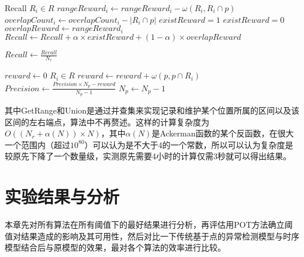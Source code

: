 \begin{breakablealgorithm}
\begin{algorithmic}[1]
      \State

      \State Recall 
      \ForAll $R_i \in R$
            \State $rangeReward_i \gets rangeReward_i - \omega(R_i,R_i \cap p)$
            \State $overlapCount_i \gets overlapCount_i - |R_i\cap p|$
              \State $existReward = 1$
            \Else
              \State $existReward = 0$
            \EndIf
            \State $overlapReward \gets rangeReward_i$
            \State $Recall \gets Recall +  \alpha \times existReward + (1-\alpha) \times overlapReward$
      \EndFor

      \State

      \State $Recall \gets \frac{Recall}{N_r}$

      \State $reward \gets 0$
      \ForAll $R_i \in R$
            \State $reward \gets reward + \omega(p, p \cap R_i)$
      \EndFor
      \State $Precision \gets \frac{Precision \times N_p - reward}{N_p - 1}$
      \State $N_p \gets N_p - 1$
      \EndFunction
    \end{algorithmic}
  \end{breakablealgorithm}

  其中GetRange和Union是通过并查集来实现记录和维护某个位置所属的区间以及该区间的左右端点，算法中不再赘述。这样的计算复杂度为$O((N_r + \alpha(N))\times N)$，其中$\alpha(N)$是Ackerman函数的某个反函数，在很大一个范围内（超过$10^{80}$）可以认为是不大于4的一个常数，所以可以认为复杂度是较原先下降了一个数量级，实测原先需要4小时的计算仅需3秒就可以得出结果。
\section{实验结果与分析}
本章先对所有算法在所有阈值下的最好结果进行分析，再评估用POT方法确立阈值对结果造成的影响及其可用性，然后对比一下传统基于点的异常检测模型与时序模型结合后与原模型的效果，最对各个算法的效率进行比较。
